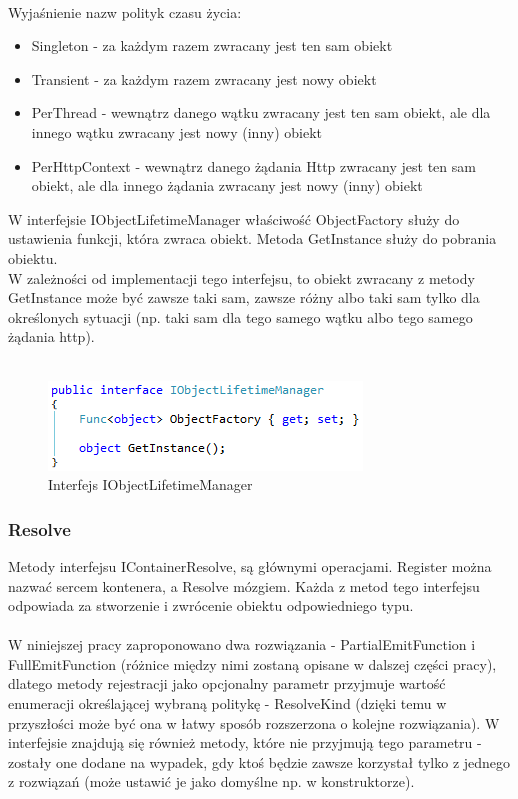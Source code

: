 \documentclass[12pt]{article}
\begin{document}
\\
Wyjaśnienie nazw polityk czasu życia:
\begin{itemize}
	\item Singleton - za każdym razem zwracany jest ten sam obiekt
	\item Transient - za każdym razem zwracany jest nowy obiekt
	\item PerThread - wewnątrz danego wątku zwracany jest ten sam obiekt, ale dla innego wątku zwracany jest nowy (inny) obiekt
	\item PerHttpContext - wewnątrz danego żądania Http zwracany jest ten sam obiekt, ale dla innego żądania zwracany jest nowy (inny) obiekt
\end{itemize}

W interfejsie IObjectLifetimeManager właściwość ObjectFactory służy do ustawienia funkcji, która zwraca obiekt. Metoda GetInstance służy do pobrania obiektu.\\
W zależności od implementacji tego interfejsu, to obiekt zwracany z metody GetInstance może być zawsze taki sam, zawsze różny albo taki sam tylko dla określonych sytuacji (np. taki sam dla tego samego wątku albo tego samego żądania http).\\ \\
\begin{figure}[H]
	\begin{center}
  		\includegraphics{IObjectLifetimeManager.png}
  		\caption{Interfejs IObjectLifetimeManager}
  		\label{fig:IObjectLifetimeManager}
	\end{center}
\end{figure}

\subsubsection{Resolve}
Metody interfejsu IContainerResolve, są głównymi operacjami. Register można nazwać sercem kontenera, a Resolve mózgiem. Każda z metod tego interfejsu odpowiada za stworzenie i zwrócenie obiektu odpowiedniego typu.\\
\\
W niniejszej pracy zaproponowano dwa rozwiązania - PartialEmitFunction i FullEmitFunction (różnice między nimi zostaną opisane w dalszej części pracy), dlatego metody rejestracji jako opcjonalny parametr przyjmuje wartość enumeracji określającej wybraną politykę - ResolveKind (dzięki temu w przyszłości może być ona w łatwy sposób rozszerzona o kolejne rozwiązania). W interfejsie znajdują się również metody, które nie przyjmują tego parametru - zostały one dodane na wypadek, gdy ktoś będzie zawsze korzystał tylko z jednego z rozwiązań (może ustawić je jako domyślne np. w konstruktorze).
\end{document}
